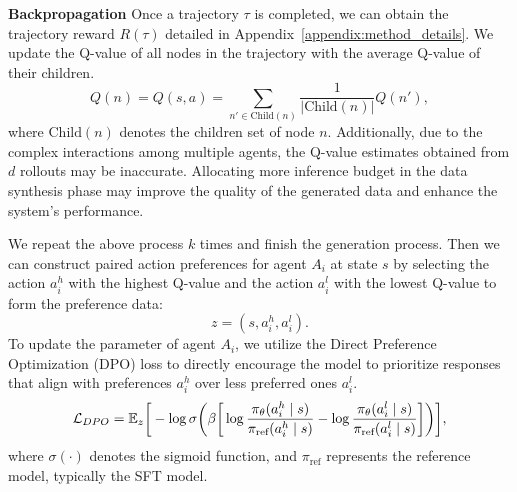 \textbf{Backpropagation} Once a trajectory $\tau$ is completed, we can obtain the trajectory reward $R(\tau)$ detailed in Appendix~\ref{appendix:method_details}. We update the Q-value of all nodes in the trajectory with the average Q-value of their children.
\begin{equation}
    Q(n) = Q(s,a) = \sum_{n'\in \text{Child}(n)} \frac{1}{|\text{Child}(n)|} Q(n'),
\end{equation}
where $\text{Child}(n)$ denotes the children set of node $n$. Additionally, due to the complex interactions among multiple agents, the Q-value estimates obtained from $d$ rollouts may be inaccurate. Allocating more inference budget in the data synthesis phase may improve the quality of the generated data and enhance the system’s performance.

We repeat the above process $k$ times and finish the generation process. Then we can construct paired action preferences for agent $A_i$ at state $s$ by selecting the action $a_i^h$ with the highest Q-value and the action $a_i^l$ with the lowest Q-value to form the preference data:
\begin{equation}
    z  = \left(s, a_i^{h}, a_i^{l}\right).
\end{equation}
To update the parameter of agent $A_i$, we utilize the Direct Preference Optimization (DPO) loss to directly encourage the model to prioritize responses that align with preferences $a_i^{h}$ over less preferred ones $a_i^{l}$.
\begin{equation}
\small
    \mathcal{L}_{DPO} = \mathbb{E}_{z} \bigg[ 
    -\log \sigma \bigg( \beta \bigg[
        \log \frac{\pi_\theta(a_i^{h} \mid s)}{\pi_{\text{ref}}(a_i^{h} \mid s)} 
        - \log \frac{\pi_\theta(a_i^{l} \mid s)}{\pi_{\text{ref}}(a_i^{l} \mid s)}
    \bigg] \bigg) \bigg],
\end{equation}
where $\sigma(\cdot)$ denotes the sigmoid function, and $\pi_{\text{ref}}$ represents the reference model, typically the SFT model.



